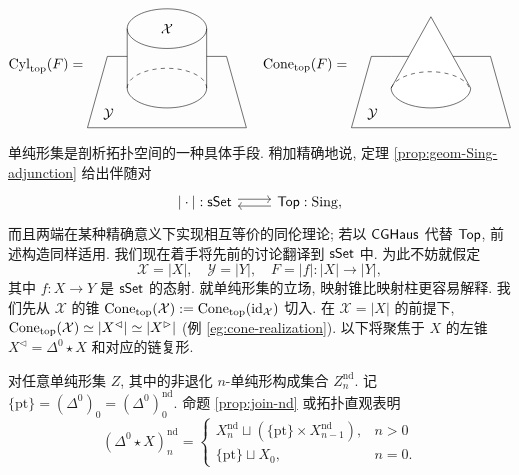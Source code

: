 \[ \Cyl_{\mathrm{top}}(F) = \begin{tikzpicture}[baseline=(O)]
	\draw (1, 1.5) ellipse[x radius=1, y radius=0.5] node {$\mathcal{X}$};
	\draw (0, 0) arc[start angle=180, end angle=360, x radius=1, y radius=0.5];
	\draw[dashed] (0, 0) arc[start angle=180, end angle=0, x radius=1, y radius=0.5];
	\draw (2, 1.5) -- (2, 0);
	\draw (0, 1.5) -- (0, 0);
	\draw (0, 0.8) -- (-0.5, 0.8) -- (-1, -1) node[xshift=1.5em,  yshift=1em] {$\mathcal{Y}$} -- (3, -1) -- (2.5, 0.8) -- (2, 0.8);
	\coordinate (O) at (0, 0.5);
\end{tikzpicture} \quad
	\Cone_{\mathrm{top}}(F) = \begin{tikzpicture}[baseline=(O)]
	\draw (0, 0.8) -- (-0.5, 0.8) -- (-1, -1) node[xshift=1.5em,  yshift=1em] {$\mathcal{Y}$} -- (3, -1) -- (2.5, 0.8) --cycle;
	\filldraw[fill=white] (1, 1.8) -- (0, 0) arc[start angle=180, end angle=360, x radius=1, y radius=0.5] --cycle;
	\draw[dashed] (0, 0) arc[start angle=170, end angle=10, x radius=1, y radius=0.5];
	\coordinate (O) at (0, 0.5);
\end{tikzpicture}\]

单纯形集是剖析拓扑空间的一种具体手段. 稍加精确地说, 定理 \ref{prop:geom-Sing-adjunction} 给出伴随对
\[\begin{tikzcd}
	{|\cdot|}: \cate{sSet} \arrow[shift left, r] & \cate{Top}: \mathrm{Sing}, \arrow[shift left, l]
\end{tikzcd}\]
而且两端在某种精确意义下实现相互等价的同伦理论; 若以 $\mathsf{CGHaus}$ 代替 $\mathsf{Top}$, 前述构造同样适用. 我们现在着手将先前的讨论翻译到 $\mathsf{sSet}$ 中. 为此不妨就假定
\[ \mathcal{X} = |X|, \quad \mathcal{Y} = |Y|, \quad F = |f|: |X| \to |Y|, \]
其中 $f: X \to Y$ 是 $\mathsf{sSet}$ 的态射. 就单纯形集的立场, 映射锥比映射柱更容易解释. 我们先从 $\mathcal{X}$ 的锥 $\operatorname{Cone}_{\mathrm{top}}(\mathcal{X}) := \operatorname{Cone}_{\mathrm{top}}(\mathrm{id}_{\mathcal{X}})$ 切入. 在 $\mathcal{X} = |X|$ 的前提下, $\operatorname{Cone}_{\mathrm{top}}(\mathcal{X}) \simeq |X^{\lhd}| \simeq |X^{\rhd}|$ (例 \ref{eg:cone-realization}). 以下将聚焦于 $X$ 的左锥 $X^{\lhd} = \Delta^0 \star X$ 和对应的链复形.

对任意单纯形集 $Z$, 其中的非退化 $n$-单纯形构成集合 $Z^{\mathrm{nd}}_n$. 记 $\{\mathrm{pt}\} = (\Delta^0)_0 = (\Delta^0)^{\mathrm{nd}}_0$. 命题 \ref{prop:join-nd} 或拓扑直观表明
\begin{equation}\label{eqn:Cone-X-aux1}
	(\Delta^0 \star X)^{\mathrm{nd}}_n = \begin{cases}
		X^{\mathrm{nd}}_n \sqcup \left( \{ \mathrm{pt} \} \times X^{\mathrm{nd}}_{n-1} \right), & n > 0 \\
		\{\mathrm{pt}\} \sqcup X_0, & n = 0.
	\end{cases}
\end{equation}

